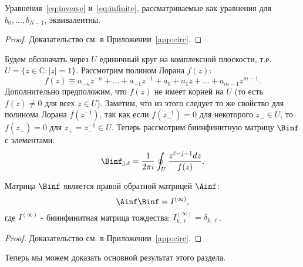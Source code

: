 \begin{lemma}\label{lm:equivalent}
	Уравнения~\eqref{eq:inverse} и~\eqref{eq:infinite}, рассматриваемые как уравнения для $b_0,\dots,b_{N-1}$, эквивалентны.
\end{lemma}
\begin{proof}
	Доказательство см. в Приложении~\ref{app:circ}.
\end{proof}
Будем обозначать через $U$ единичный круг на комплексной плоскости, т.е. $U = \{z\in\mathbb{C}: |z| = 1\}$.
Рассмотрим полином Лорана $f(z)$:
%
\begin{equation}\label{eq:laurent}
f(z) \equiv a_{-n}z^{-n} + \dots + a_{-1}z^{-1} + a_0 + a_1 z + \dots +a_{m-1}z^{m-1}.
\end{equation}
%
Дополнительно предположим, что $f(z)$ не имеет корней на $U$ (то есть $f(z) \neq 0$ для всех $z \in U$).
Заметим, что из этого следует то же свойство для полинома Лорана $f(z^{-1})$, так как если $f(z_-^{-1}) = 0$ для некоторого $z_- \in U$, то $f(z_+) = 0$ для $z_+ = z^{-1}_- \in U$.
Теперь рассмотрим биинфинитную матрицу $\Binf$ с элементами:
\begin{equation}\label{eq:B}
\Binf_{j,\ell} = \frac{1}{2\pi i} \oint_U \frac{z^{\ell - j-1}dz}{f(z)}.
\end{equation}
\begin{lemma} \label{lm:unnamed}
	Матрица $\Binf$ является правой обратной матрицей $\Ainf$:
	\[
	\Ainf \Binf = I^{(\infty)},
	\]
	где $I^{(\infty)}$ - биинфинитная матрица тождества: $I^{(\infty)}_{k,\ell} = \delta_{k,\ell}$.
\end{lemma}
\begin{proof}
	Доказательство см. в Приложении~\ref{app:circ}.
\end{proof}
%
Теперь мы можем доказать основной результат этого раздела.
